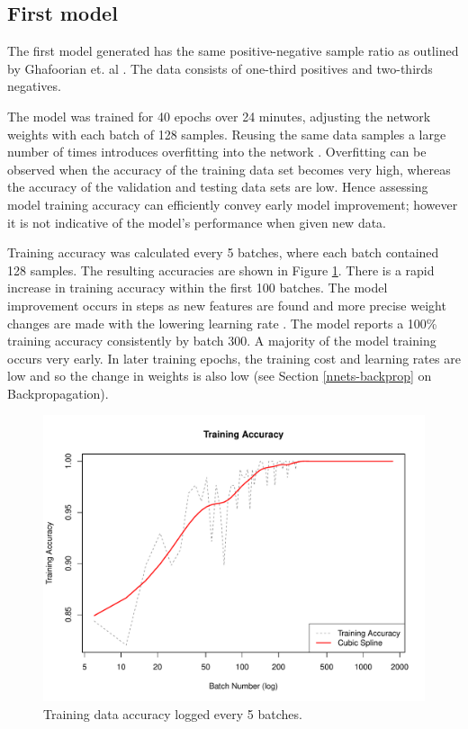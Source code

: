 \subsection*{First model}

The first model generated has the same positive-negative sample ratio as outlined by Ghafoorian et. al \cite{GhafoorianM.2017Dml3}. The data consists of one-third positives and two-thirds negatives.

The model was trained for 40 epochs over 24 minutes, adjusting the network weights with each batch of 128 samples. Reusing the same data samples a large number of times introduces overfitting into the network \cite{Goodfellow-et-al-2016}. Overfitting can be observed when the accuracy of the training data set becomes very high, whereas the accuracy of the validation and testing data sets are low. Hence assessing model training accuracy can efficiently convey early model improvement; however it is not indicative of the model's performance when given new data.

Training accuracy was calculated every 5 batches, where each batch contained 128 samples. The resulting accuracies are shown in Figure \ref{results-train-acc4-fig}. There is a rapid increase in training accuracy within the first 100 batches. The model improvement occurs in steps as new features are found and more precise weight changes are made with the lowering learning rate \cite{Folly2009, Nielson2015}. The model reports a 100\% training accuracy consistently by batch 300. A majority of the model training occurs very early. In later training epochs, the training cost and learning rates are low and so the change in weights is also low (see Section \ref{nnets-backprop} on Backpropagation).

\begin{figure}[hb]
	\centering
	\includegraphics[width=\textwidth]{Images/7_train_acc4.pdf}
	\caption{Training data accuracy logged every 5 batches.}
	\label{results-train-acc4-fig}
\end{figure}

